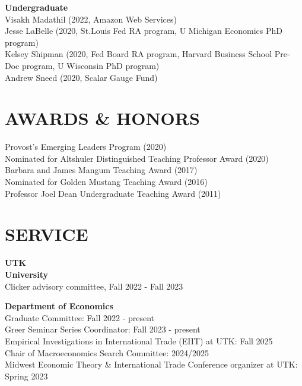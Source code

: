 \documentclass[11pt]{res}
\begin{document}
\begin{resume}
\textbf{Undergraduate}\vspace{1.5mm}\\
Visakh Madathil (2022, Amazon Web Services)\vspace{1.5mm}\\
Jesse LaBelle (2020, St.Louis Fed RA program, U Michigan Economics PhD program)\vspace{1.5mm}\\
Kelsey Shipman (2020, Fed Board RA program, Harvard Business School Pre-Doc program, U Wisconsin PhD program)\vspace{1.5mm}\\
Andrew Sneed (2020, Scalar Gauge Fund)

\section{AWARDS \& HONORS} \vspace{1.5mm}
Provost's Emerging Leaders Program (2020)\vspace{1.5mm}\\
Nominated for Altshuler Distinguished Teaching Professor Award (2020)\vspace{1.5mm}\\
Barbara and James Mangum Teaching Award (2017)\vspace{1.5mm}\\
Nominated for Golden Mustang Teaching Award (2016)\vspace{1.5mm}\\
Professor Joel Dean Undergraduate Teaching Award (2011)\vspace{3mm}

\section{SERVICE} \vspace{1.5mm}
\textbf{UTK}\vspace{1.5mm}\\
\textbf{University}\vspace{1.5mm}\\
Clicker advisory committee, Fall 2022 - Fall 2023

\textbf{Department of Economics}\vspace{1.5mm}\\
Graduate Committee: Fall 2022 - present\vspace{1.5mm}\\
Greer Seminar Series Coordinator: Fall 2023 - present\vspace{1.5mm}\\
Empirical Investigations in International Trade (EIIT) at UTK: Fall 2025\vspace{1.5mm}\\
Chair of Macroeconomics Search Committee: 2024/2025\vspace{1.5mm}\\
Midwest Economic Theory \& International Trade Conference organizer at UTK: Spring 2023


\end{resume}
\end{document}
